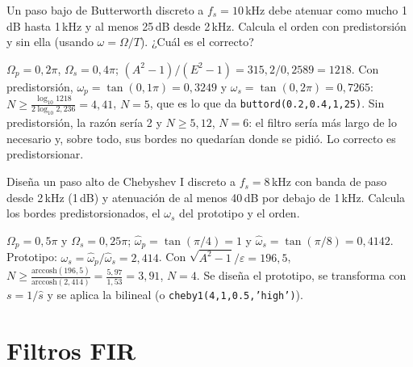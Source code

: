 \documentclass[11pt,a4paper]{scrartcl}
\begin{document}
\begin{ejercicio}
  Un paso bajo de Butterworth discreto a $f_s=10$\,kHz debe atenuar como mucho 1\,dB hasta 1\,kHz y al menos 25\,dB desde 2\,kHz. Calcula el orden con predistorsión y sin ella (usando $\omega=\Omega/T$). ¿Cuál es el correcto?
\end{ejercicio}
\begin{solucion}
  $\Omega_p=0{,}2\pi$, $\Omega_s=0{,}4\pi$; $(A^2-1)/(E^2-1)=315{,}2/0{,}2589=1218$. Con predistorsión, $\omega_p=\tan(0{,}1\pi)=0{,}3249$ y $\omega_s=\tan(0{,}2\pi)=0{,}7265$: $N\ge\frac{\log_{10}1218}{2\log_{10}2{,}236}=4{,}41$, $N=5$, que es lo que da \texttt{buttord(0.2,0.4,1,25)}. Sin predistorsión, la razón sería 2 y $N\ge5{,}12$, $N=6$: el filtro sería más largo de lo necesario y, sobre todo, sus bordes no quedarían donde se pidió. Lo correcto es predistorsionar.
\end{solucion}

\begin{ejercicio}
  Diseña un paso alto de Chebyshev I discreto a $f_s=8$\,kHz con banda de paso desde 2\,kHz (1\,dB) y atenuación de al menos 40\,dB por debajo de 1\,kHz. Calcula los bordes predistorsionados, el $\omega_s$ del prototipo y el orden.
\end{ejercicio}
\begin{solucion}
  $\Omega_p=0{,}5\pi$ y $\Omega_s=0{,}25\pi$; $\hat\omega_p=\tan(\pi/4)=1$ y $\hat\omega_s=\tan(\pi/8)=0{,}4142$. Prototipo: $\omega_s=\hat\omega_p/\hat\omega_s=2{,}414$. Con $\sqrt{A^2-1}/\varepsilon=196{,}5$, $N\ge\frac{\mathrm{arccosh}(196{,}5)}{\mathrm{arccosh}(2{,}414)}=\frac{5{,}97}{1{,}53}=3{,}91$, $N=4$. Se diseña el prototipo, se transforma con $s=1/\hat s$ y se aplica la bilineal (o \texttt{cheby1(4,1,0.5,'high')}).
\end{solucion}

\section*{Filtros FIR}
\end{document}

